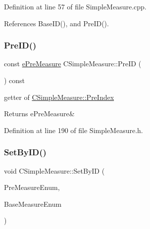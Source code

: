 Definition at line 57 of file Simple\+Measure.\+cpp.



References Base\+I\+D(), and Pre\+I\+D().

\mbox{\label{classCSimpleMeasure_ae2704585c95b6a165e982186afef5556}} 
\subsubsection{\texorpdfstring{Pre\+I\+D()}{PreID()}}
{\footnotesize\ttfamily const \hyperlink{PreMeasure_8h_a6c81167b8d4c2badde42f81cb7214620}{e\+Pre\+Measure} C\+Simple\+Measure\+::\+Pre\+ID (\begin{DoxyParamCaption}{ }\end{DoxyParamCaption}) const\hspace{0.3cm}{\ttfamily [inline]}}



getter of \hyperlink{classCSimpleMeasure_aa23ed9eec21adb9a97c90a424e7ee18a}{C\+Simple\+Measure\+::\+Pre\+Index} 

\begin{DoxyReturn}{Returns}
e\+Pre\+Measure\& 
\end{DoxyReturn}


Definition at line 190 of file Simple\+Measure.\+h.

\mbox{\label{classCSimpleMeasure_a6945aa333dca5623482d38cd9a7e3225}} 
\subsubsection{\texorpdfstring{Set\+By\+I\+D()}{SetByID()}}
{\footnotesize\ttfamily void C\+Simple\+Measure\+::\+Set\+By\+ID (\begin{DoxyParamCaption}\item[{const \hyperlink{PreMeasure_8h_a6c81167b8d4c2badde42f81cb7214620}{e\+Pre\+Measure}}]{Pre\+Measure\+Enum,  }\item[{const \hyperlink{BaseMeasure_8h_ac90e5164ccf1f0d648fba7e94b229a11}{e\+Base\+Measure}}]{Base\+Measure\+Enum }\end{DoxyParamCaption})}



